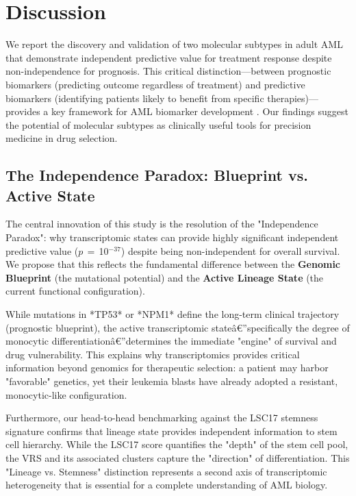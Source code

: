 \documentclass[11pt,a4paper]{article}
\newcommand{\pval}[1]{$p$\,$=$\,#1}
\begin{document}
\section{Discussion}

We report the discovery and validation of two molecular subtypes in adult AML that demonstrate independent predictive value for treatment response despite non-independence for prognosis. This critical distinction---between prognostic biomarkers (predicting outcome regardless of treatment) and predictive biomarkers (identifying patients likely to benefit from specific therapies)---provides a key framework for AML biomarker development \cite{ballman2015biomarker}. Our findings suggest the potential of molecular subtypes as clinically useful tools for precision medicine in drug selection.

\subsection{The Independence Paradox: Blueprint vs. Active State}

The central innovation of this study is the resolution of the "Independence Paradox": why transcriptomic states can provide highly significant independent predictive value (\pval{10$^{-37}$}) despite being non-independent for overall survival. We propose that this reflects the fundamental difference between the \textbf{Genomic Blueprint} (the mutational potential) and the \textbf{Active Lineage State} (the current functional configuration). 

While mutations in *TP53* or *NPM1* define the long-term clinical trajectory (prognostic blueprint), the active transcriptomic stateâ€”specifically the degree of monocytic differentiationâ€”determines the immediate "engine" of survival and drug vulnerability. This explains why transcriptomics provides critical information beyond genomics for therapeutic selection: a patient may harbor "favorable" genetics, yet their leukemia blasts have already adopted a resistant, monocytic-like configuration. 

Furthermore, our head-to-head benchmarking against the LSC17 stemness signature confirms that lineage state provides independent information to stem cell hierarchy. While the LSC17 score quantifies the "depth" of the stem cell pool, the VRS and its associated clusters capture the "direction" of differentiation. This "Lineage vs. Stemness" distinction represents a second axis of transcriptomic heterogeneity that is essential for a complete understanding of AML biology.
\end{document}
